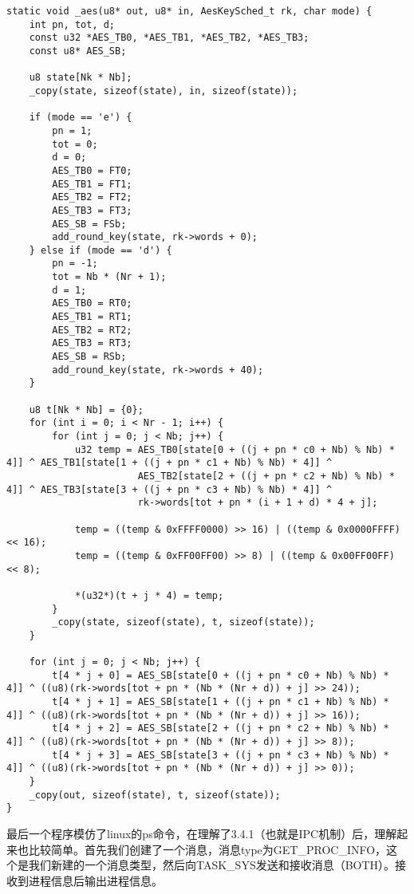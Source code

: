 \documentclass{whureport}
\begin{document}
\begin{lstlisting}
static void _aes(u8* out, u8* in, AesKeySched_t rk, char mode) {
    int pn, tot, d;
    const u32 *AES_TB0, *AES_TB1, *AES_TB2, *AES_TB3;
    const u8* AES_SB;

    u8 state[Nk * Nb];
    _copy(state, sizeof(state), in, sizeof(state));

    if (mode == 'e') {
        pn = 1;
        tot = 0;
        d = 0;
        AES_TB0 = FT0;
        AES_TB1 = FT1;
        AES_TB2 = FT2;
        AES_TB3 = FT3;
        AES_SB = FSb;
        add_round_key(state, rk->words + 0);
    } else if (mode == 'd') {
        pn = -1;
        tot = Nb * (Nr + 1);
        d = 1;
        AES_TB0 = RT0;
        AES_TB1 = RT1;
        AES_TB2 = RT2;
        AES_TB3 = RT3;
        AES_SB = RSb;
        add_round_key(state, rk->words + 40);
    }

    u8 t[Nk * Nb] = {0};
    for (int i = 0; i < Nr - 1; i++) {
        for (int j = 0; j < Nb; j++) {
            u32 temp = AES_TB0[state[0 + ((j + pn * c0 + Nb) % Nb) * 4]] ^ AES_TB1[state[1 + ((j + pn * c1 + Nb) % Nb) * 4]] ^
                       AES_TB2[state[2 + ((j + pn * c2 + Nb) % Nb) * 4]] ^ AES_TB3[state[3 + ((j + pn * c3 + Nb) % Nb) * 4]] ^
                       rk->words[tot + pn * (i + 1 + d) * 4 + j];

            temp = ((temp & 0xFFFF0000) >> 16) | ((temp & 0x0000FFFF) << 16);
            temp = ((temp & 0xFF00FF00) >> 8) | ((temp & 0x00FF00FF) << 8);

            *(u32*)(t + j * 4) = temp;
        }
        _copy(state, sizeof(state), t, sizeof(state));
    }

    for (int j = 0; j < Nb; j++) {
        t[4 * j + 0] = AES_SB[state[0 + ((j + pn * c0 + Nb) % Nb) * 4]] ^ ((u8)(rk->words[tot + pn * (Nb * (Nr + d)) + j] >> 24));
        t[4 * j + 1] = AES_SB[state[1 + ((j + pn * c1 + Nb) % Nb) * 4]] ^ ((u8)(rk->words[tot + pn * (Nb * (Nr + d)) + j] >> 16));
        t[4 * j + 2] = AES_SB[state[2 + ((j + pn * c2 + Nb) % Nb) * 4]] ^ ((u8)(rk->words[tot + pn * (Nb * (Nr + d)) + j] >> 8));
        t[4 * j + 3] = AES_SB[state[3 + ((j + pn * c3 + Nb) % Nb) * 4]] ^ ((u8)(rk->words[tot + pn * (Nb * (Nr + d)) + j] >> 0));
    }
    _copy(out, sizeof(state), t, sizeof(state));
}
\end{lstlisting}

最后一个程序模仿了linux的ps命令，在理解了3.4.1（也就是IPC机制）后，理解起来也比较简单。首先我们创建了一个消息，消息type为GET\_PROC\_INFO，这个是我们新建的一个消息类型，然后向TASK\_SYS发送和接收消息（BOTH）。接收到进程信息后输出进程信息。
\end{document}
